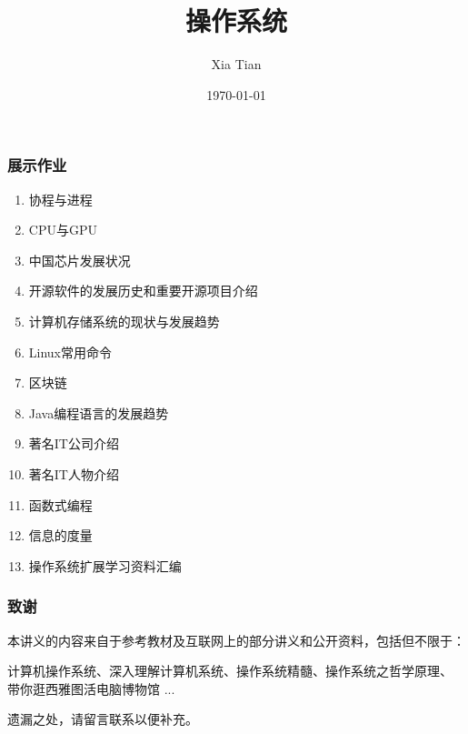 \documentclass[table, t,13pt]{beamer}
\begin{document}
  \title{操作系统}
  \author{Xia Tian }
  \date{\today{}}

  \frame{\titlepage}

%
%

%
%
%

  \begin{frame}
    \frametitle{展示作业}
    \begin{enumerate}
    \item 协程与进程
    \item CPU与GPU
    \item 中国芯片发展状况
    \item 开源软件的发展历史和重要开源项目介绍
    \item 计算机存储系统的现状与发展趋势
    \item Linux常用命令
    \item 区块链
    \item Java编程语言的发展趋势
    \item 著名IT公司介绍
    \item 著名IT人物介绍
    \item 函数式编程
    \item 信息的度量
    \item 操作系统扩展学习资料汇编 
    \end{enumerate}
  \end{frame}

\begin{frame}[fragile]
  \frametitle{致谢}

  本讲义的内容来自于参考教材及互联网上的部分讲义和公开资料，包括但不限于：

  计算机操作系统、深入理解计算机系统、操作系统精髓、操作系统之哲学原理、
  带你逛西雅图活电脑博物馆 ...

  遗漏之处，请留言联系以便补充。
\end{frame}
\end{document}
